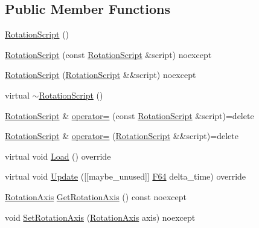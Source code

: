 \subsection*{Public Member Functions}
\begin{DoxyCompactItemize}
\item 
\hyperlink{classmage_1_1script_1_1_rotation_script_a2961e96c890f5b737fa1851a4f6434fe}{Rotation\+Script} ()
\item 
\hyperlink{classmage_1_1script_1_1_rotation_script_adac08b8383fabba67df915f03a2a01ee}{Rotation\+Script} (const \hyperlink{classmage_1_1script_1_1_rotation_script}{Rotation\+Script} \&script) noexcept
\item 
\hyperlink{classmage_1_1script_1_1_rotation_script_a56942de038a4899fa2fb3d9199f18052}{Rotation\+Script} (\hyperlink{classmage_1_1script_1_1_rotation_script}{Rotation\+Script} \&\&script) noexcept
\item 
virtual \hyperlink{classmage_1_1script_1_1_rotation_script_a7deb74070c49b78b0b91e3599ee8a0b7}{$\sim$\+Rotation\+Script} ()
\item 
\hyperlink{classmage_1_1script_1_1_rotation_script}{Rotation\+Script} \& \hyperlink{classmage_1_1script_1_1_rotation_script_afa4e9fcddf4f20f6c471dfd5fed1610f}{operator=} (const \hyperlink{classmage_1_1script_1_1_rotation_script}{Rotation\+Script} \&script)=delete
\item 
\hyperlink{classmage_1_1script_1_1_rotation_script}{Rotation\+Script} \& \hyperlink{classmage_1_1script_1_1_rotation_script_a72642ac8b1f210ab4eb7feb67238a1bb}{operator=} (\hyperlink{classmage_1_1script_1_1_rotation_script}{Rotation\+Script} \&\&script)=delete
\item 
virtual void \hyperlink{classmage_1_1script_1_1_rotation_script_a7a632d323f57f4f2f19c0562bd0656e1}{Load} () override
\item 
virtual void \hyperlink{classmage_1_1script_1_1_rotation_script_a868768482599b478e8fd8afe371b6c54}{Update} (\mbox{[}\mbox{[}maybe\+\_\+unused\mbox{]}\mbox{]} \hyperlink{namespacemage_ad26233bbec640deda836e572c1a23708}{F64} delta\+\_\+time) override
\item 
\hyperlink{classmage_1_1script_1_1_rotation_script_a54e1d1d0af65f43f5bc5ad65a4b9c00a}{Rotation\+Axis} \hyperlink{classmage_1_1script_1_1_rotation_script_ac2ef46249d59b379f47336eb250f3a28}{Get\+Rotation\+Axis} () const noexcept
\item 
void \hyperlink{classmage_1_1script_1_1_rotation_script_aa4b49dc5e34da3e851d5aefc4c4a434b}{Set\+Rotation\+Axis} (\hyperlink{classmage_1_1script_1_1_rotation_script_a54e1d1d0af65f43f5bc5ad65a4b9c00a}{Rotation\+Axis} axis) noexcept
\end{DoxyCompactItemize}
